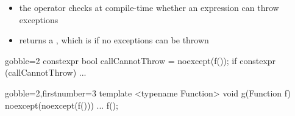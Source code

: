 \begin{advanced}
\begin{frame}[fragile]
  \begin{block}{}
    \begin{itemize}
      \item the  operator checks at compile-time whether an expression can throw exceptions
      \item returns a , which is  if no exceptions can be thrown
    \end{itemize}
  \end{block}
  \begin{block}{}
    \begin{cppcode*}{gobble=2}
      constexpr bool callCannotThrow = noexcept(f());
      if constexpr (callCannotThrow) { ... }
    \end{cppcode*}
  \end{block}
  \begin{block}{}
    \begin{cppcode*}{gobble=2,firstnumber=3}
      template <typename Function>
      void g(Function f) noexcept(noexcept(f())) {
        ...
        f();
      }
    \end{cppcode*}
  \end{block}
\end{frame}


\end{advanced}

